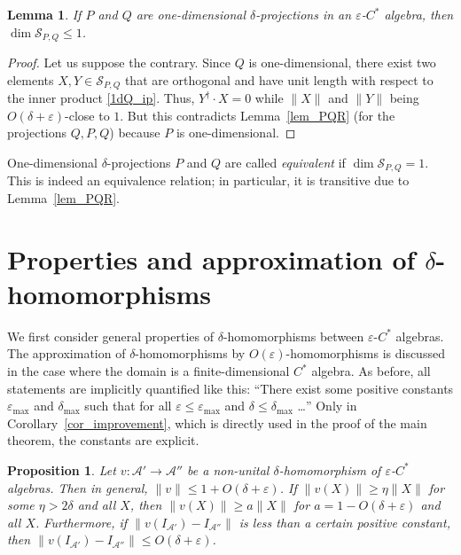 \documentclass[12pt]{article}
\newcommand{\calA}{\mathcal{A}}
\newcommand{\calS}{\mathcal{S}}
\newcommand{\eps}{\varepsilon}
\renewcommand{\le}{\leqslant}
\renewcommand{\ge}{\geqslant}
\newtheorem{Proposition}[Theorem]{Proposition}
\newtheorem{Lemma}[Theorem]{Lemma}
\newtheorem[definition]{Definition}[Theorem]{Definition}
\newtheorem[remark]{Example}[Theorem]{Example}
\newtheorem[remark]{Remark}[Theorem]{Remark}
\newtheorem[remark]{Question}[Theorem]{Open question}
\newtheorem*[definition]{definition}{Definition}
\newtheorem*[remark]{example}{Example}
\newtheorem*[remark]{remark}{Remark}
\newtheorem*[remark]{question}{Open question}
\numberwithin{equation}{section}
\begin{document}
\begin{Lemma}\label{lem_1d_proj}
If $P$ and $Q$ are one-dimensional $\delta$-projections in an $\eps$-$C^*$ algebra, then $\dim\calS_{P,Q}\le 1$.
\end{Lemma}

\begin{proof}
Let us suppose the contrary. Since $Q$ is one-dimensional, there exist two elements $X,Y\in\calS_{P,Q}$ that are orthogonal and have unit length with respect to the inner product \eqref{1dQ_ip}. Thus, $Y^\dag\cdot X=0$ while $\|X\|$ and $\|Y\|$ being $O(\delta+\eps)$-close to $1$. But this contradicts Lemma~\ref{lem_PQR} (for the projections $Q,P,Q$) because $P$ is one-dimensional.
\end{proof}

One-dimensional $\delta$-projections $P$ and $Q$ are called \emph{equivalent} if $\dim\calS_{P,Q}=1$. This is indeed an equivalence relation; in particular, it is transitive due to Lemma~\ref{lem_PQR}.


\section{Properties and approximation of \texorpdfstring{$\delta$}{delta}-homomorphisms}

We first consider general properties of $\delta$-homomorphisms between $\eps$-$C^*$ algebras. The approximation of $\delta$-homomorphisms by $O(\eps)$-homomorphisms is discussed in the case where the domain is a finite-dimensional $C^*$ algebra. As before, all statements are implicitly quantified like this: ``There exist some positive constants $\eps_{\max}$ and $\delta_{\max}$ such that for all $\eps\le\eps_{\max}$ and $\delta\le\delta_{\max}$ \ldots'' Only in Corollary~\ref{cor_improvement}, which is directly used in the proof of the main theorem, the constants are explicit.

\begin{Proposition}\label{prop_delta_hominc}
Let $v\colon \calA'\to\calA''$ be a non-unital $\delta$-homomorphism of $\eps$-$C^*$ algebras. Then in general, $\|v\|\le 1+O(\delta+\eps)$. If $\|v(X)\|\ge\eta\|X\|$ for some $\eta>2\delta$ and all $X$, then $\|v(X)\|\ge a\|X\|$ for $a=1-O(\delta+\eps)$ and all $X$. Furthermore, if $\|v(I_{\calA'})-I_{\calA''}\|$ is less than a certain positive constant, then $\|v(I_{\calA'})-I_{\calA''}\|\le O(\delta+\eps)$.
\end{Proposition}
\end{document}
